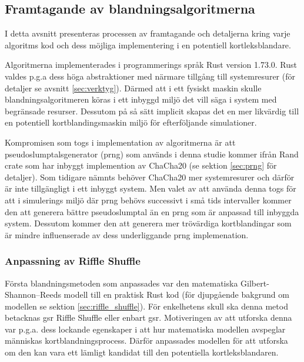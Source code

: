 \documentclass[swedish,a4paper]{article}
\begin{document}
\subsection{Framtagande av blandningsalgoritmerna}
\label{sec:algos}
I detta avsnitt presenteras processen av framtagande och 
detaljerna kring varje algoritms kod och dess
möjliga implementering i en potentiell kortleksblandare.

Algoritmerna implementerades i programmerings språk Rust version 1.73.0. Rust
valdes p.g.a dess höga abstraktioner med närmare tillgång till systemresurer
(för detaljer se avsnitt \ref{sec:verktyg}). Därmed att i ett fysiskt maskin
skulle blandningsalgoritmeren köras i ett inbyggd miljö det vill säga i system med
begränsade resurser. Dessutom på så sätt implicit skapas det en mer likvärdig till en
potentiell kortblandingsmaskin miljö för efterföljande simulationer. 

Kompromisen som togs i implementation av algoritmerna är att
pseudoslumptalsgenerator (\gls{prng}) som används i denna studie kommer ifrån
Rand \gls{crate} som har inbyggt implemention av ChaCha20 (se sektion
\ref{sec:prng} för detaljer). Som tidigare nämnts behöver ChaCha20 mer
systemresurer och därför är inte tillgängligt i ett inbyggt system. Men
valet av att använda denna togs för att i simulerings miljö där \gls{prng} behövs
successivt i små tids intervaller kommer den att generera bättre pseudoslumptal
än en \gls{prng} som är anpassad till inbyggda system. Dessutom kommer den att
generera mer trövärdiga kortblandingar som är mindre influenserade av dess
underliggande \gls{prng} implemenation. 

\subsubsection{Anpassning av Riffle Shuffle}

 

Första blandningsmetoden som anpassades var den matematiska
Gilbert-Shannon–Reeds modell till en praktisk Rust kod (för djupgående bakgrund
om modellen se sektion \ref{sec:riffle_shuffle}). För enkelhetens skull ska denna metod
betacknas \gls{gsr} Riffle Shuffle eller enbart \gls{gsr}. Motiveringen av att
utforska denna var  p.g.a. dess lockande egenskaper i att hur matematiska
modellen avspeglar människas kortblandningsprocess. Därför anpassades modellen för att
utforska om den kan vara ett lämligt kandidat till den potentiella
kortleksblandaren.
\end{document}
